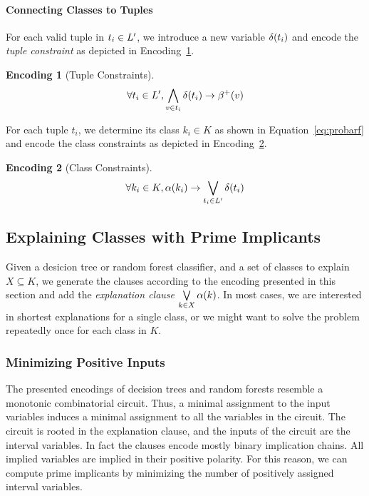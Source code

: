 \documentclass{easychair}
\theoremstyle{definition}
\newtheorem{encoding}{Encoding}[section]
\begin{document}
\paragraph{Connecting Classes to Tuples}

For each valid tuple in $t_i \in L'$, we introduce a new variable $\delta(t_i)$ and encode the \emph{tuple constraint} as depicted in Encoding~\ref{enc:tuple}. 
%
\begin{encoding}[Tuple Constraints]
\label{enc:tuple}
\begin{align*}
\forall t_i \in L', \bigwedge\limits_{v \in t_i} \delta(t_i) \rightarrow \beta^+(v)
\end{align*}
\end{encoding}
%
For each tuple $t_i$, we determine its class $k_i \in K$ as shown in Equation~\ref{eq:probarf} and encode the class constraints as depicted in Encoding~\ref{enc:class-rf}. 
%
\begin{encoding}[Class Constraints]
\label{enc:class-rf}
\begin{align*}
\forall k_i \in K, \alpha(k_i) \rightarrow \bigvee\limits_{t_i \in L'} \delta(t_i)
\end{align*}
\end{encoding}


\subsection{Explaining Classes with Prime Implicants}
\label{sec:approach:pi}

Given a desicion tree or random forest classifier, and a set of classes to explain $X \subseteq K$, we generate the clauses according to the encoding presented in this section and add the \emph{explanation clause} $\bigvee\limits_{k \in X} \alpha(k)$. 
In most cases, we are interested in shortest explanations for a single class, or we might want to solve the problem repeatedly once for each class in $K$. 

\subsubsection{Minimizing Positive Inputs}

The presented encodings of decision trees and random forests resemble a monotonic combinatorial circuit. 
Thus, a minimal assignment to the input variables induces a minimal assignment to all the variables in the circuit. 
The circuit is rooted in the explanation clause, and the inputs of the circuit are the interval variables. 
In fact the clauses encode mostly binary implication chains. 
All implied variables are implied in their positive polarity. 
For this reason, we can compute prime implicants by minimizing the number of positively assigned interval variables. 
\end{document}
